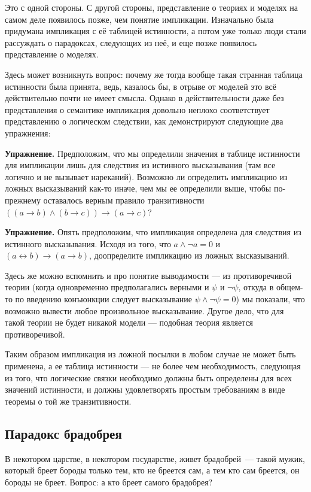 Это с одной стороны. С другой стороны, представление о теориях и моделях на самом деле появилось позже, чем понятие импликации. Изначально была придумана импликация с её таблицей истинности, а потом уже только люди стали рассуждать о парадоксах, следующих из неё, и еще позже появилось представление о моделях.

Здесь может возникнуть вопрос: почему же тогда вообще такая странная таблица истинности была принята, ведь, казалось бы, в отрыве от моделей это всё действительно почти не имеет смысла. Однако в действительности даже без представления о семантике импликация довольно неплохо соответствует представлению о логическом следствии, как демонстрируют следующие два упражнения:

{\bfseries Упражнение.} Предположим, что мы определили значения в таблице истинности для импликации лишь для следствия из истинного высказывания (там все логично и не вызывает нареканий). Возможно ли определить импликацию из ложных высказываний как-то иначе, чем мы ее определили выше, чтобы по-прежнему оставалось верным правило транзитивности $((a\rightarrow b)\wedge(b\rightarrow c))\rightarrow (a\rightarrow c)$?

{\bfseries Упражнение.} Опять предположим, что импликация определена для следствия из истинного высказывания. Исходя из того, что $a\wedge\neg a = 0$ и $(a\leftrightarrow b)\rightarrow(a \rightarrow b)$, доопределите импликацию из ложных высказываний.

Здесь же можно вспомнить и про понятие выводимости — из противоречивой теории (когда одновременно предполагались верными и $\psi$ и $\neg\psi$, откуда в общем-то по введению конъюнкции следует высказывание $\psi\wedge\neg\psi=0$) мы показали, что возможно вывести любое произвольное высказывание. Другое дело, что для такой теории не будет никакой модели — подобная теория является противоречивой.

Таким образом импликация из ложной посылки в любом случае не может быть применена, а ее таблица истинности — не более чем необходимость, следующая из того, что логические связки необходимо должны быть определены для всех значений истинности, и должны удовлетворять простым требованиям в виде теоремы о той же транзитивности.

\subsection{Парадокс брадобрея}

В некотором царстве, в некотором государстве, живет брадобрей~--- такой мужик, который бреет бороды только тем, кто не бреется сам, а тем кто сам бреется, он бороды не бреет. Вопрос: а кто бреет самого брадобрея?

